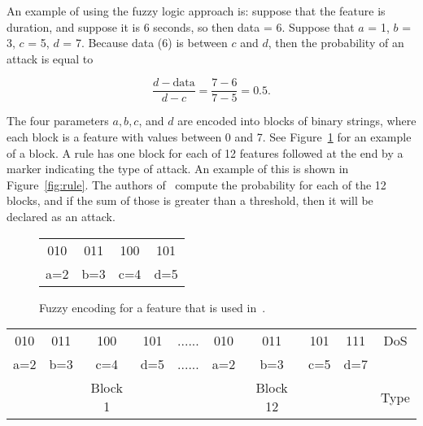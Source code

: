 \documentclass{sig-alternate}
\begin{document}
\begin{algorithm}[t]
\caption{Fuzzy Algorithm that is based on an algorithm used in~\cite{6496342, 6559603}, but a few corrections have been made. Also see Figure~\ref{fig:trapFigure}.}
\label{alg:fuzAlg}
\begin{algorithmic}
\ELSE {}
\ENDIF
\end{algorithmic}
\end{algorithm}

An example of using the fuzzy logic approach is: suppose that the feature is duration, and suppose it is 6 seconds, so then data = 6. Suppose that $a$ = 1, $b$ = 3, $c$ = 5, $d$ = 7. Because data (6) is between $c$ and $d$, then the probability of an attack is equal to

\begin{equation*}
\frac{d-\textrm{data}}{d-c} = \frac{7-6}{7-5} = 0.5.
\end{equation*}


The four parameters $a, b, c$, and $d$ are encoded into blocks of binary strings, where each block is a feature with values between 0 and 7. See Figure~\ref{fig:fuzEncodingForFeature} for an example of a block. A rule has one block for each of 12 features followed at the end by a marker indicating the type of attack. An example of this is shown in Figure~\ref{fig:rule}. The authors of~\cite{6496342, 6559603} compute the probability for each of the 12 blocks, and if the sum of those is greater than a threshold, then it will be declared as an attack.

\begin{figure}
\centering
\caption{Fuzzy encoding for a feature that is used in~\cite{6496342, 6559603}.}
\vspace{0.20cm}
\begin{tabular}{|cccc|} \hline
010 & 011 & 100 & 101\\
a=2 & b=3 & c=4 & d=5\\
\hline\end{tabular}
\label{fig:fuzEncodingForFeature}
\end{figure}

\begin{figure*}
\centering
\caption{A rule with 12 blocks of features used in~\cite{6496342, 6559603}.}
\vspace{0.20cm}
\begin{tabular}{|cccc|c|cccc|c|} \hline
010 & 011 & 100 & 101   & ...... & 010 & 011 & 101 & 111   & DoS\\
a=2 & b=3 & c=4 & d=5   & ...... & a=2 & b=3 & c=5 & d=7   &\\ 
    &     & Block 1&    &        &     & Block 12& &       & Type\\
\hline\end{tabular}
\label{fig:rule}
\end{figure*}
\end{document}
